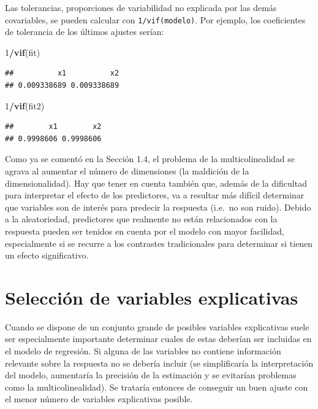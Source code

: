 \documentclass[
]{book}
\newenvironment{Shaded}{\begin{snugshade}}{\end{snugshade}}
\newcommand{\DecValTok}[1]{\textcolor[rgb]{0.00,0.00,0.81}{#1}}
\newcommand{\KeywordTok}[1]{\textcolor[rgb]{0.13,0.29,0.53}{\textbf{#1}}}
\newcommand{\NormalTok}[1]{#1}
\newcommand{\OperatorTok}[1]{\textcolor[rgb]{0.81,0.36,0.00}{\textbf{#1}}}
\theoremstyle{break}
\theoremstyle{definition}
\theoremstyle{definition}
\theoremstyle{definition}
\theoremstyle{remark}
\begin{document}
Las tolerancias, proporciones de variabilidad no explicada por las demás covariables, se pueden calcular con \texttt{1/vif(modelo)}.
Por ejemplo, los coeficientes de tolerancia de los últimos ajustes serían:

\begin{Shaded}
\begin{Highlighting}[]
\DecValTok{1}\OperatorTok{/}\KeywordTok{vif}\NormalTok{(fit)}
\end{Highlighting}
\end{Shaded}

\begin{verbatim}
##          x1          x2 
## 0.009338689 0.009338689
\end{verbatim}

\begin{Shaded}
\begin{Highlighting}[]
\DecValTok{1}\OperatorTok{/}\KeywordTok{vif}\NormalTok{(fit2) }
\end{Highlighting}
\end{Shaded}

\begin{verbatim}
##        x1        x2 
## 0.9998606 0.9998606
\end{verbatim}

Como ya se comentó en la Sección 1.4, el problema de la multicolinealidad se agrava al aumentar el número de dimensiones (la maldición de la dimensionalidad).
Hay que tener en cuenta también que, además de la dificultad para interpretar el efecto de los predictores, va a resultar más difícil determinar que variables son de interés para predecir la respuesta (i.e.~no son ruido). Debido a la aleatoriedad, predictores que realmente no están relacionados con la respuesta pueden ser tenidos en cuenta por el modelo con mayor facilidad, especialmente si se recurre a los contrastes tradicionales para determinar si tienen un efecto significativo.

\hypertarget{seleccion-reg-lineal}{%
\section{Selección de variables explicativas}\label{seleccion-reg-lineal}}

Cuando se dispone de un conjunto grande de posibles variables explicativas
suele ser especialmente importante determinar cuales de estas deberían ser
incluidas en el modelo de regresión. Si alguna de las variables no contiene
información relevante sobre la respuesta no se debería incluir (se simplificaría
la interpretación del modelo, aumentaría la precisión de la estimación y se
evitarían problemas como la multicolinealidad). Se trataría entonces de conseguir
un buen ajuste con el menor número de variables explicativas posible.
\end{document}
